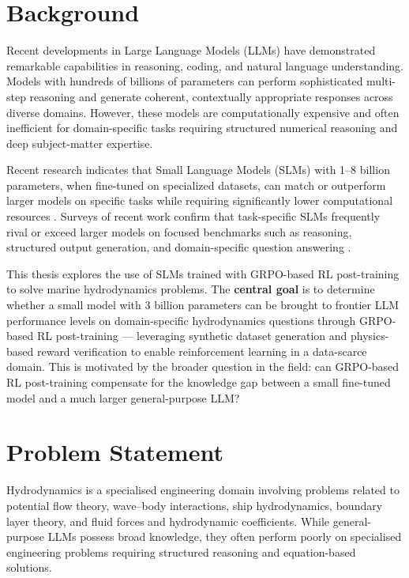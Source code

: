 \documentclass[12pt]{report}
\begin{document}
\section{Background}

Recent developments in Large Language Models (LLMs) have demonstrated remarkable capabilities in reasoning, coding, and natural language understanding. Models with hundreds of billions of parameters can perform sophisticated multi-step reasoning and generate coherent, contextually appropriate responses across diverse domains. However, these models are computationally expensive and often inefficient for domain-specific tasks requiring structured numerical reasoning and deep subject-matter expertise.

Recent research indicates that Small Language Models (SLMs) with 1--8 billion parameters, when fine-tuned on specialized datasets, can match or outperform larger models on specific tasks while requiring significantly lower computational resources \citep{slm_survey2025}. Surveys of recent work confirm that task-specific SLMs frequently rival or exceed larger models on focused benchmarks such as reasoning, structured output generation, and domain-specific question answering \citep{redhat_slm2024}.

This thesis explores the use of SLMs trained with GRPO-based RL post-training to solve marine hydrodynamics problems. The \textbf{central goal} is to determine whether a small model with 3 billion parameters can be brought to frontier LLM performance levels on domain-specific hydrodynamics questions through GRPO-based RL post-training --- leveraging synthetic dataset generation and physics-based reward verification to enable reinforcement learning in a data-scarce domain. This is motivated by the broader question in the field: can GRPO-based RL post-training compensate for the knowledge gap between a small fine-tuned model and a much larger general-purpose LLM?

\section{Problem Statement}

Hydrodynamics is a specialised engineering domain involving problems related to potential flow theory, wave--body interactions, ship hydrodynamics, boundary layer theory, and fluid forces and hydrodynamic coefficients. While general-purpose LLMs possess broad knowledge, they often perform poorly on specialised engineering problems requiring structured reasoning and equation-based solutions.
\end{document}
